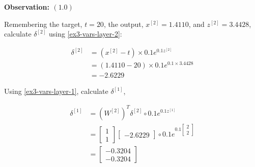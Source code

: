 \documentclass[12pt]{article}
\begin{document}
\begin{enumerate}[leftmargin=\labelsep]
\begin{paracol}{3}
              \switchcolumn

              \begin{center}
                  \textbf{Observation: $(1.0)$}
              \end{center}

              Remembering the target, $t = 20$,
              the output, $x^{[2]} = 1.4110$,
              and $z^{[2]} = 3.4428$,
              calculate $\delta^{[2]}$ using \eqref{ex3-vars-layer-2}:

              \begin{footnotesize}
                  $$
                      \begin{aligned}
                          \delta^{[2]} & = \left(x^{[2]} - t\right) \times 0.1 e^{0.1 z^{[2]}} \\
                                       & = (1.4110 - 20) \times 0.1 e^{0.1 \times 3.4428}      \\
                                       & = -2.6229
                      \end{aligned}
                  $$
              \end{footnotesize}

              Using \eqref{ex3-vars-layer-1}, calculate $\delta^{[1]}$,
              \begin{footnotesize}
                  $$
                      \begin{aligned}
                          \delta^{[1]} & = \left(W^{[2]}\right)^T \delta^{[2]} \circ 0.1 e^{0.1 z^{[1]}} \\
                                       & = \begin{bmatrix}
                                               1 \\ 1
                                           \end{bmatrix}
                          \begin{bmatrix}
                              -2.6229
                          \end{bmatrix}
                          \circ
                          0.1 e^{0.1 \begin{bmatrix}
                                                 2 \\
                                                 2
                                             \end{bmatrix}}                                                      \\
                                       & = \begin{bmatrix}
                                               -0.3204 \\
                                               -0.3204
                                           \end{bmatrix}
                      \end{aligned}
                  $$
              \end{footnotesize}


\end{paracol}
\end{enumerate}
\end{document}
